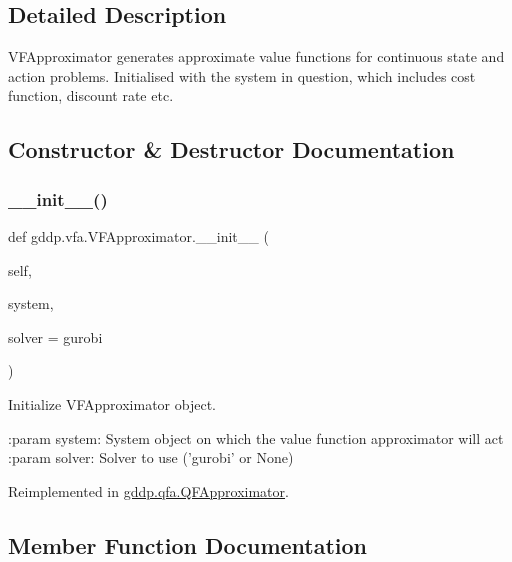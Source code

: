 \subsection{Detailed Description}
\begin{DoxyVerb}VFApproximator generates approximate value functions for continuous state and action
problems. Initialised with the system in question, which includes cost function, discount rate
etc.
\end{DoxyVerb}
 

\subsection{Constructor \& Destructor Documentation}
\mbox{\label{classgddp_1_1vfa_1_1_v_f_approximator_abe39aff2fd28268fc81a555b4d362a6b}} 
\subsubsection{\texorpdfstring{\_\_init\_\_()}{\_\_init\_\_()}}
{\footnotesize\ttfamily def gddp.\+vfa.\+V\+F\+Approximator.\+\_\+\+\_\+init\+\_\+\+\_\+ (\begin{DoxyParamCaption}\item[{}]{self,  }\item[{}]{system,  }\item[{}]{solver = {\ttfamily \textquotesingle{}gurobi\textquotesingle{}} }\end{DoxyParamCaption})}

\begin{DoxyVerb}Initialize VFApproximator object.

:param system: System object on which the value function approximator will act
:param solver: Solver to use ('gurobi' or None)
\end{DoxyVerb}
 

Reimplemented in \mbox{\hyperlink{classgddp_1_1qfa_1_1_q_f_approximator_a93a03d1246461e93c47cb88b8991cae8}{gddp.\+qfa.\+Q\+F\+Approximator}}.



\subsection{Member Function Documentation}
\mbox{\label{classgddp_1_1vfa_1_1_v_f_approximator_a5f5aa5208b059f55b4db350c4d5e1cc5}} 
